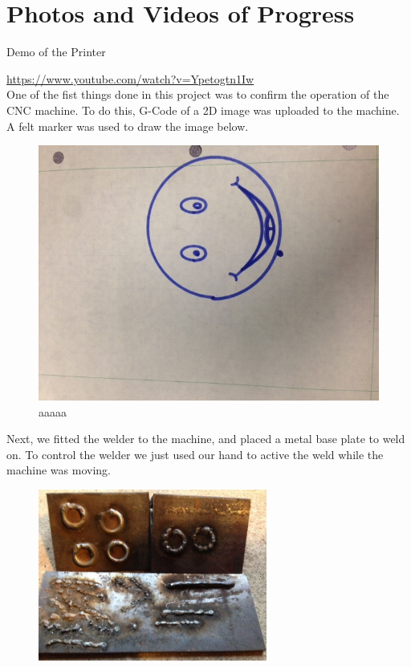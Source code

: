 \documentclass[12pt]{article}
\begin{document}
\clearpage


\section{Photos and Videos of Progress}

Demo of the Printer

\href{https://www.youtube.com/watch?v=Ypetogtn1Iw}{https://www.youtube.com/watch?v=Ypetogtn1Iw}\\

One of the fist things done in this project was to confirm the operation of the CNC machine. To do this, G-Code of a 2D image was uploaded to the machine. A felt marker was used to draw the image below. \\

\begin{figure}[!h]
\centering
\includegraphics[scale=0.6]{pic1}
\caption{aaaaa}
\end{figure}

Next, we fitted the welder to the machine, and placed a metal base plate to weld on. To control the welder we just used our hand to active the weld while the machine was moving.

\clearpage


\begin{figure}[h]
\centering
\includegraphics[width=0.67\textwidth]{pic2}
\end{figure}
\end{document}
